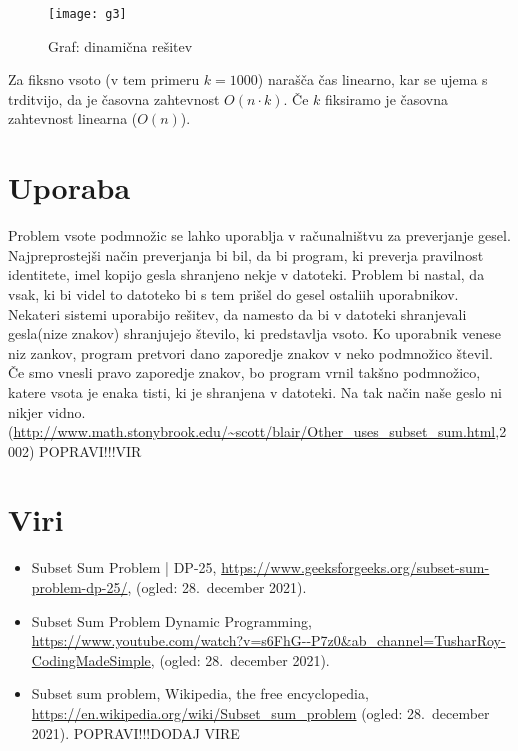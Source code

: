 \documentclass[12pt]{article}
\begin{document}
\newpage
  \begin{figure}[]
  \caption{Graf: dinamična rešitev} 
  \centering
  \texttt{[image: g3]}\newline
\end{figure}
Za fiksno vsoto (v tem primeru $k = 1000$) narašča čas linearno, kar se ujema
  s trditvijo, da je časovna zahtevnost $O(n\cdot k)$. Če $k$ fiksiramo 
  je časovna zahtevnost linearna ($O(n)$).

\section{Uporaba}
Problem vsote podmnožic se lahko uporablja v računalništvu za preverjanje gesel.
Najpreprostejši način preverjanja bi bil, da bi program, ki preverja pravilnost identitete,
imel kopijo gesla shranjeno nekje v datoteki. Problem bi nastal, da vsak, ki bi videl
to datoteko bi s tem prišel do gesel ostaliih uporabnikov.
Nekateri sistemi uporabijo rešitev, da namesto da bi v datoteki shranjevali gesla(nize znakov)
shranjujejo število, ki predstavlja vsoto. \newline
Ko uporabnik venese niz zankov, program pretvori dano zaporedje znakov v neko podmnožico števil.
 Če smo vnesli pravo zaporedje znakov, bo program vrnil takšno podmnožico, katere vsota
je enaka tisti, ki je shranjena v datoteki. Na tak način naše geslo ni nikjer vidno.
(\url{http://www.math.stonybrook.edu/~scott/blair/Other_uses_subset_sum.html},2002)
POPRAVI!!!VIR
\newpage
\section{Viri}
\begin{itemize}
\item Subset Sum Problem | DP-25,  \newline
\url{https://www.geeksforgeeks.org/subset-sum-problem-dp-25/}, \newline
(ogled: 28.\ december 2021).
\item Subset Sum Problem Dynamic Programming,
\url{https://www.youtube.com/watch?v=s6FhG--P7z0&ab_channel=TusharRoy-CodingMadeSimple},\newline
(ogled: 28.\ december 2021).
\item Subset sum problem, Wikipedia, the free encyclopedia,\newline
\url{https://en.wikipedia.org/wiki/Subset_sum_problem} \newline
(ogled: 28.\ december 2021).
POPRAVI!!!DODAJ VIRE
\end{itemize}

  
\end{document}
